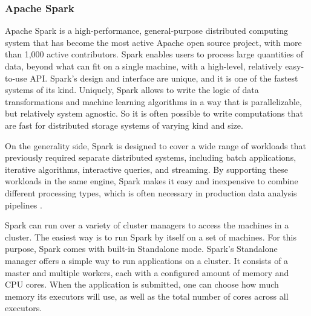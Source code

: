 

\subsubsection{Apache Spark}

Apache Spark is a high-performance, general-purpose distributed computing system that has become the most active Apache open source project, with more than 1,000 active contributors. Spark enables users to process large quantities of data, beyond what can fit on a single machine, with a high-level, relatively easy-to-use API. Spark’s design and interface are unique, and it is one of the fastest systems of its kind. Uniquely, Spark allows to write the logic of data transformations and machine learning algorithms in a way that is parallelizable, but relatively system agnostic. So it is often possible to write computations that are fast for distributed storage systems of varying kind and size.

On the generality side, Spark is designed to cover a wide range of workloads that previously required separate distributed systems, including batch applications, iterative algorithms, interactive queries, and streaming. By supporting these workloads in the same engine, Spark makes it easy and inexpensive to combine different processing types, which is often necessary in production data analysis pipelines \cite{learning_spark}.

Spark can run over a variety of cluster managers to access the machines in a cluster. The easiest way is to run Spark by itself on a set of machines. For this purpose, Spark comes with built-in Standalone mode. Spark’s Standalone manager offers a simple way to run applications on a cluster. It consists of a master and multiple workers, each with a configured amount of memory and CPU cores. When the application is submitted, one can choose how much memory its executors will use, as well as the total number of cores across all executors.

